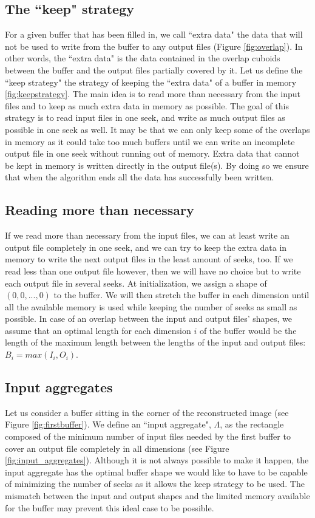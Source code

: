 \documentclass[conference]{IEEEtran}
\begin{document}
\subsection{The ``keep" strategy}
For a given buffer that has been filled in, we call ``extra data" the data that will not be used to write from the buffer to any output files (Figure \ref{fig:overlap}).
In other words, the ``extra data" is the data contained in the overlap cuboids between the buffer and the output files partially covered by it.
Let us define the ``keep strategy" the strategy of keeping the ``extra data" of a buffer in memory \ref{fig:keepstrategy}.
The main idea is to read more than necessary from the input files and to keep as much extra data in memory as possible.
The goal of this strategy is to read input files in one seek, and write as much output files as possible in one seek as well.
It may be that we can only keep some of the overlaps in memory as it could take too much buffers until we can write an incomplete output file in one seek without running out of memory.
Extra data that cannot be kept in memory is written directly in the output file(s).
By doing so we ensure that when the algorithm ends all the data has successfully been written. \\

\subsection{Reading more than necessary}
If we read more than necessary from the input files, we can at least write an output file completely in one seek, and we can try to keep the extra data in memory to write the next output files in the least amount of seeks, too.
If we read less than one output file however, then we will have no choice but to write each output file in several seeks.
At initialization, we assign a shape of $(0, 0,..., 0)$ to the buffer.
We will then stretch the buffer in each dimension until all the available memory is used while keeping the number of seeks as small as possible.
In case of an overlap between the input and output files' shapes, we assume that an optimal length for each dimension $i$ of the buffer would be the length of the maximum length between the lengths of the input and output files: $B_i = max(I_i,O_i)$.

\subsection{Input aggregates}
Let us consider a buffer sitting in the corner of the reconstructed image (see Figure \ref{fig:firstbuffer}).
We define an ``input aggregate", $\Lambda$, as the rectangle composed of the minimum number of input files needed by the first buffer to cover an output file completely in all dimensions (see Figure \ref{fig:input_aggregates}).
Although it is not always possible to make it happen, the input aggregate has the optimal buffer shape we would like to have to be capable of minimizing the number of seeks as it allows the keep strategy to be used.
The mismatch between the input and output shapes and the limited memory available for the buffer may prevent this ideal case to be possible. \\
\end{document}
